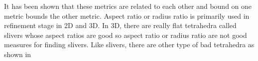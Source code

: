 It has been shown that these metrics are related to each other and bound on one metric bounds the other metric. Aspect ratio or radius ratio is primarily used in refinement stage in 2D and 3D. In 3D, there are really flat tetrahedra called slivers whose aspect ratios are good so aspect ratio or radius ratio are not good measures for finding slivers. Like slivers, there are other type of bad tetrahedra as shown in 









